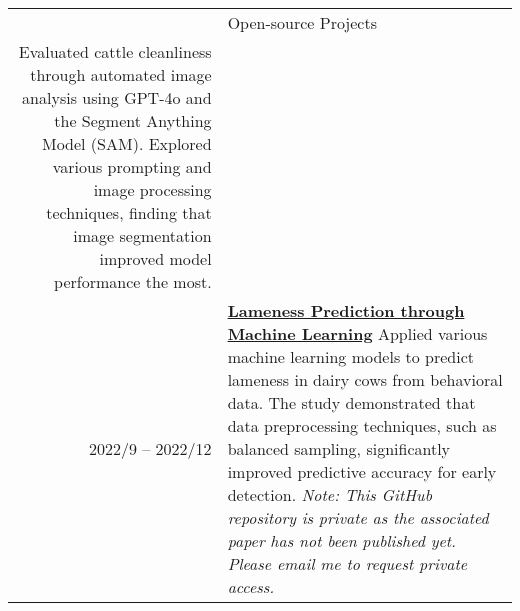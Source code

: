 \documentclass[letterpaper, 11pt]{article}
\newcommand{\socialicon}[1]{\raisebox{-0.05em}{\resizebox{!}{1em}{#1}}}
\newcommand{\headingfont}{\Large\color{OliveGreen}}
\newenvironment{SectionTable}[1]{
	\renewcommand*{\arraystretch}{1.7}
	\setlength{\tabcolsep}{10pt}
	\begin{longtable}{Rp{5.2in}} & #1 \\}
{\end{longtable}\vspace{-.3cm}}
\begin{document}
\begin{SectionTable}{\headingfont Open-source Projects}
	Evaluated cattle cleanliness through automated image analysis using GPT-4o and the Segment Anything Model (SAM). Explored various prompting and image processing techniques, finding that image segmentation improved model performance the most. \\
	2022/9 -- 2022/12 &
	\textbf{\href{https://github.com/skysheng7/Lameness-prediction-ML.git}{Lameness Prediction through Machine Learning}} \socialicon{\faGithub} \newline
	Applied various machine learning models to predict lameness in dairy cows from behavioral data. The study demonstrated that data preprocessing techniques, such as balanced sampling, significantly improved predictive accuracy for early detection. \newline
	\textit{Note: This GitHub repository is private as the associated paper has not been published yet. Please email me to request private access.} \\
	\end{SectionTable}
\end{document}
